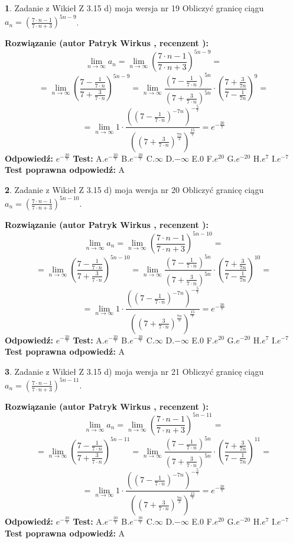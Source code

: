\documentclass[12pt, a4paper]{article}
\theoremstyle{definition} %
\newtheorem{zad}{}
\newcommand{\zadStart}[1]{\begin{zad}#1\newline}
\newcommand{\zadStop}{\end{zad}}
\newcommand{\rozwStart}[2]{\noindent \textbf{Rozwiązanie (autor #1 , recenzent #2): }\newline}
\newcommand{\rozwStop}{\newline}
\newcommand{\odpStart}{\noindent \textbf{Odpowiedź:}\newline}
\newcommand{\odpStop}{\newline}
\newcommand{\testStart}{\noindent \textbf{Test:}\newline}
\newcommand{\testStop}{\newline}
\newcommand{\kluczStart}{\noindent \textbf{Test poprawna odpowiedź:}\newline}
\newcommand{\kluczStop}{\newline}
\begin{document}
\zadStart{Zadanie z Wikieł Z 3.15 d) moja wersja nr 19}
Obliczyć granicę ciągu $a_{n}=(\frac{7\cdot n - 1}{7 \cdot n + 3})^{5n-9}$.
\zadStop
\rozwStart{Patryk Wirkus}{}
$$\lim\limits_{n\to\infty} a_{n} = \lim\limits_{n\to\infty}(\frac{7\cdot n - 1}{7 \cdot n + 3})^{5n-9}=$$
$$=\lim\limits_{n\to\infty}(\frac{7 - \frac{1}{7\cdot n}}{7 + \frac{3}{7 \cdot n}})^{5n-9}=\lim\limits_{n\to\infty}\frac{(7 - \frac{1}{7\cdot n})^{5n}}{(7 + \frac{3}{7\cdot n})^{5n}} \cdot (\frac{7+\frac{3}{7n}}{7-\frac{1}{7n}})^{9}=$$
$$=\lim\limits_{n\to\infty} 1 \cdot \frac{((7-\frac{1}{7 \cdot n})^{-7n})^{-\frac{5}{7}}}{((7+\frac{3}{7 \cdot n})^{\frac{7n}{3}})^{\frac{15}{7}}} =e^{-\frac{20}{7}}$$
\rozwStop
\odpStart
$e^{-\frac{20}{7}}$
\odpStop
\testStart
A.$ e^{-\frac{20}{7}}$
B.$ e^{-\frac{20}{7}}$
C.$\infty$
D.$-\infty$
E.$0$
F.$e^{20}$
G.$e^{-20}$
H.$e^{7}$
I.$e^{-7}$
\testStop
\kluczStart
A
\kluczStop



\zadStart{Zadanie z Wikieł Z 3.15 d) moja wersja nr 20}
Obliczyć granicę ciągu $a_{n}=(\frac{7\cdot n - 1}{7 \cdot n + 3})^{5n-10}$.
\zadStop
\rozwStart{Patryk Wirkus}{}
$$\lim\limits_{n\to\infty} a_{n} = \lim\limits_{n\to\infty}(\frac{7\cdot n - 1}{7 \cdot n + 3})^{5n-10}=$$
$$=\lim\limits_{n\to\infty}(\frac{7 - \frac{1}{7\cdot n}}{7 + \frac{3}{7 \cdot n}})^{5n-10}=\lim\limits_{n\to\infty}\frac{(7 - \frac{1}{7\cdot n})^{5n}}{(7 + \frac{3}{7\cdot n})^{5n}} \cdot (\frac{7+\frac{3}{7n}}{7-\frac{1}{7n}})^{10}=$$
$$=\lim\limits_{n\to\infty} 1 \cdot \frac{((7-\frac{1}{7 \cdot n})^{-7n})^{-\frac{5}{7}}}{((7+\frac{3}{7 \cdot n})^{\frac{7n}{3}})^{\frac{15}{7}}} =e^{-\frac{20}{7}}$$
\rozwStop
\odpStart
$e^{-\frac{20}{7}}$
\odpStop
\testStart
A.$ e^{-\frac{20}{7}}$
B.$ e^{-\frac{20}{7}}$
C.$\infty$
D.$-\infty$
E.$0$
F.$e^{20}$
G.$e^{-20}$
H.$e^{7}$
I.$e^{-7}$
\testStop
\kluczStart
A
\kluczStop



\zadStart{Zadanie z Wikieł Z 3.15 d) moja wersja nr 21}
Obliczyć granicę ciągu $a_{n}=(\frac{7\cdot n - 1}{7 \cdot n + 3})^{5n-11}$.
\zadStop
\rozwStart{Patryk Wirkus}{}
$$\lim\limits_{n\to\infty} a_{n} = \lim\limits_{n\to\infty}(\frac{7\cdot n - 1}{7 \cdot n + 3})^{5n-11}=$$
$$=\lim\limits_{n\to\infty}(\frac{7 - \frac{1}{7\cdot n}}{7 + \frac{3}{7 \cdot n}})^{5n-11}=\lim\limits_{n\to\infty}\frac{(7 - \frac{1}{7\cdot n})^{5n}}{(7 + \frac{3}{7\cdot n})^{5n}} \cdot (\frac{7+\frac{3}{7n}}{7-\frac{1}{7n}})^{11}=$$
$$=\lim\limits_{n\to\infty} 1 \cdot \frac{((7-\frac{1}{7 \cdot n})^{-7n})^{-\frac{5}{7}}}{((7+\frac{3}{7 \cdot n})^{\frac{7n}{3}})^{\frac{15}{7}}} =e^{-\frac{20}{7}}$$
\rozwStop
\odpStart
$e^{-\frac{20}{7}}$
\odpStop
\testStart
A.$ e^{-\frac{20}{7}}$
B.$ e^{-\frac{20}{7}}$
C.$\infty$
D.$-\infty$
E.$0$
F.$e^{20}$
G.$e^{-20}$
H.$e^{7}$
I.$e^{-7}$
\testStop
\kluczStart
A
\kluczStop
\end{document}

